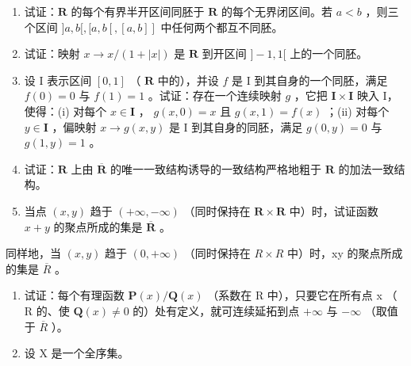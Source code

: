 \BourbakiExerciseGroup

\begin{enumerate}
\def\labelenumi{\arabic{enumi})}
\item
试证：\(\mathbf{R}\) 的每个有界半开区间同胚于 \(\mathbf{R}\) 的每个无界闭区间。若 \(a < b\) ，则三个区间 \(]a, b[, [a, b[, [a, b]]\) 中任何两个都互不同胚。
\item
试证：映射 \(x \to x / (1 + |x|)\) 是 \(\mathbf{R}\) 到开区间 \(] - 1, 1[\) 上的一个同胚。
\item
设 I 表示区间 \([0, 1]\) （ \(\mathbf{R}\) 中的），并设 \(f\) 是 I 到其自身的一个同胚，满足 \(f(0) = 0\) 与 \(f(1) = 1\) 。试证：存在一个连续映射 \(g\) ，它把 \(\mathbf{I} \times \mathbf{I}\) 映入 I，使得：(i) 对每个 \(x \in \mathbf{I}\) ， \(g(x, 0) = x\) 且 \(g(x, 1) = f(x)\) ；(ii) 对每个 \(y \in \mathbf{I}\) ，偏映射 \(x \to g(x, y)\) 是 I 到其自身的同胚，满足 \(g(0, y) = 0\) 与 \(g(1, y) = 1\) 。
\item
试证：\(\mathbf{R}\) 上由 \(\overline{\mathbf{R}}\) 的唯一一致结构诱导的一致结构严格地粗于 \(\mathbf{R}\) 的加法一致结构。
\item
当点 \((x, y)\) 趋于 \((+\infty, -\infty)\) （同时保持在 \(\mathbf{R} \times \mathbf{R}\) 中）时，试证函数 \(x + y\) 的聚点所成的集是 \(\overline{\mathbf{R}}\) 。
\end{enumerate}

同样地，当 \((x,y)\) 趋于 \((0,+\infty)\) （同时保持在 \(R\times R\) 中）时，xy 的聚点所成的集是 \(\overline{R}\) 。

\begin{enumerate}
\def\labelenumi{\arabic{enumi})}
\setcounter{enumi}{5}
\item
试证：每个有理函数 \(\mathbf{P}(x)/\mathbf{Q}(x)\) （系数在 R 中），只要它在所有点 x （ R 的、使 \(\mathbf{Q}(x)\neq0\) 的）处有定义，就可连续延拓到点 \(+\infty\) 与 \(-\infty\) （取值于 \(\overline{R}\) ）。
\item
设 X 是一个全序集。
\end{enumerate}

